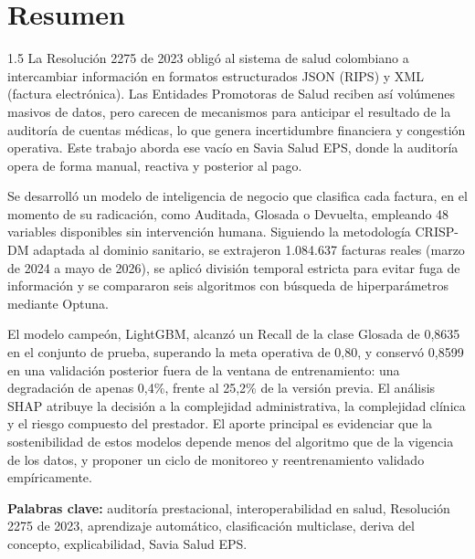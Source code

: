 \documentclass[12pt,letterpaper]{report}
\begin{document}
\clearpage
\chapter*{Resumen}
\begin{spacing}{1.5}
La Resolución 2275 de 2023 obligó al sistema de salud colombiano a intercambiar
información en formatos estructurados JSON (RIPS) y XML (factura electrónica).
Las Entidades Promotoras de Salud reciben así volúmenes masivos de datos, pero
carecen de mecanismos para anticipar el resultado de la auditoría de cuentas
médicas, lo que genera incertidumbre financiera y congestión operativa. Este
trabajo aborda ese vacío en Savia Salud EPS, donde la auditoría opera de forma
manual, reactiva y posterior al pago.

Se desarrolló un modelo de inteligencia de negocio que clasifica cada factura,
en el momento de su radicación, como Auditada, Glosada o Devuelta, empleando 48
variables disponibles sin intervención humana. Siguiendo la metodología CRISP-DM
adaptada al dominio sanitario, se extrajeron 1.084.637 facturas reales
(marzo de 2024 a mayo de 2026), se aplicó división temporal estricta para evitar
fuga de información y se compararon seis algoritmos con búsqueda de
hiperparámetros mediante Optuna.

El modelo campeón, LightGBM, alcanzó un Recall de la clase Glosada de 0,8635 en
el conjunto de prueba, superando la meta operativa de 0,80, y conservó 0,8599 en
una validación posterior fuera de la ventana de entrenamiento: una degradación
de apenas 0,4\%, frente al 25,2\% de la versión previa. El análisis SHAP atribuye
la decisión a la complejidad administrativa, la complejidad clínica y el riesgo
compuesto del prestador. El aporte principal es evidenciar que la sostenibilidad
de estos modelos depende menos del algoritmo que de la vigencia de los datos, y
proponer un ciclo de monitoreo y reentrenamiento validado empíricamente.

\textbf{Palabras clave:} auditoría prestacional, interoperabilidad en salud,
Resolución 2275 de 2023, aprendizaje automático, clasificación multiclase,
deriva del concepto, explicabilidad, Savia Salud EPS.
\end{spacing}

\clearpage
\end{document}
